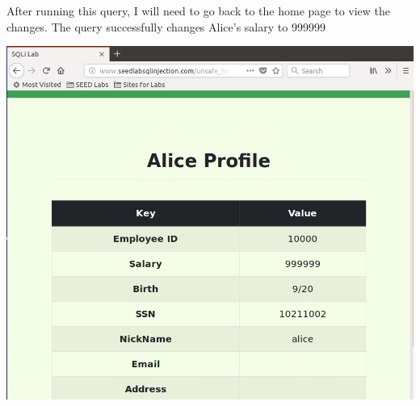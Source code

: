 \documentclass[14pt]{extarticle}
\begin{document}
After running this query, I will need to go back to the home page to view the changes. The query successfully changes Alice's salary to 999999\\
\begin{center}
	\includegraphics[width=0.6\linewidth]{alice-changed}\\
\end{center}
\end{document}
